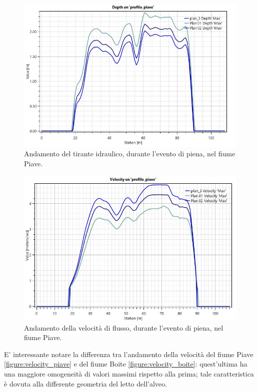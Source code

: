 \begin{figure}[H] \centering
    \includegraphics[scale=0.5]{immagini/depth_piave.JPG}
    \caption{Andamento del tirante idraulico, durante l'evento di piena, nel fiume Piave.}
    \label{figure:depth_piave}
\end{figure}

\begin{figure}[H] \centering
    \includegraphics[scale=0.5]{immagini/velocity_piave.JPG}
    \caption{Andamento della velocità di flusso, durante l'evento di piena, nel fiume Piave.}
    \label{figure:velocity_piave}
\end{figure}

E' interessante notare la differenza tra l'andamento della velocità del fiume Piave \eqref{figure:velocity_piave} e del fiume Boite \eqref{figure:velocity_boite}: quest'ultima ha una maggiore omogeneità di valori massimi rispetto alla prima; tale caratteristica è dovuta alla differente geometria del letto dell'alveo.

